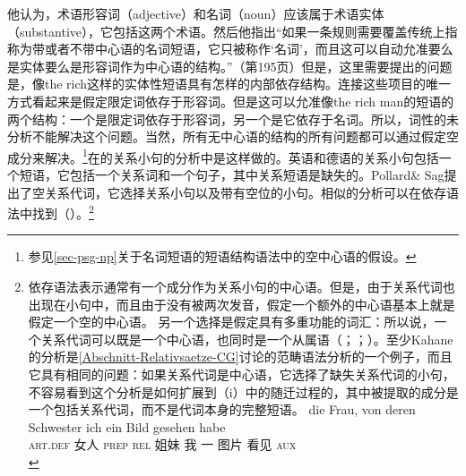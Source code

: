 他认为，术语形容词（adjective）和名词（noun）应该属于术语实体（substantive），它包括这两个术语。然后他指出“如果一条规则需要覆盖传统上指称为带或者不带中心语的名词短语，它只被称作‘名词’，而且这可以自动允准要么是实体要么是形容词作为中心语的结构。”（第195页）但是，这里需要提出的问题是，像the rich这样的实体性短语具有怎样的内部依存结构。连接这些项目的唯一方式看起来是假定限定词依存于形容词。但是这可以允准像the rich man的短语的两个结构：一个是限定词依存于形容词，另一个是它依存于名词。所以，词性的未分析不能解决这个问题。当然，所有无中心语的结构的所有问题都可以通过假定空成分来解决。\footnote{参见\ref{sec-psg-np}关于名词短语的短语结构语法中的空中心语的假设。}在\hpsgc 的关系小句的分析中是这样做的\citep[\S~5]{ps2}。英语和德语的关系小句包括一个短语，它包括一个关系词和一个句子，其中关系短语是缺失的。Pollard\& Sag提出了空关系代词，它选择关系小句以及带有空位的小句\citep[--217]{ps2}。相似的分析可以在依存语法中找到（\citealp[]{Eroms2000a}）。\footnote{%
依存语法表示通常有一个成分作为关系小句的中心语。但是，由于关系代词也出现在小句中，而且由于没有被两次发音，假定一个额外的中心语基本上就是假定一个空的中心语。
%
另一个选择是假定具有多重功能的词汇：所以说，一个关系代词可以既是一个中心语，也同时是一个从属语（\citealp[\S 246, §8--11]{Tesniere2015a-not-crossreferenced}；\citealp[\page xlvi]{KO2015a}；\citealp[--130]{Kahane2009a}）。至少Kahane的分析是\ref{Abschnitt-Relativsaetze-CG}讨论的范畴语法分析的一个例子，而且它具有相同的问题：如果关系代词是中心语，它选择了缺失关系代词的小句，不容易看到这个分析是如何扩展到（i）中的随迁过程的，其中被提取的成分是一个包括关系代词，而不是代词本身的完整短语。
\ea
\gll die Frau, von deren Schwester ich ein Bild gesehen habe\\
     \textsc{art}.\textsc{def} 女人 \textsc{prep} \textsc{rel} 姐妹 我 一 图片 看见 \textsc{aux}\\
\zlast
}
